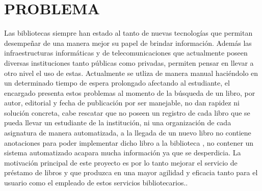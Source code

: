 \section{PROBLEMA} 

\begin{enumerate}[1.]
    
    Las bibliotecas siempre han estado al tanto de nuevas tecnologías que permitan desempeñar de una manera mejor su papel de brindar información. Además las infraestructuras informáticas y de telecomunicaciones que actualmente poseen diversas instituciones tanto públicas como privadas, permiten pensar en llevar a otro nivel el uso de estas.
    Actualmente se utliza de manera manual haciéndolo en un determinado tiempo de espera prolongado afectando al estudiante, el encargado presenta estos problemas al momento de la búsqueda de un libro, por autor, editorial y fecha de publicación por ser manejable, no dan rapidez ni solución concreta, cabe rescatar que no poseen un registro de cada libro que se pueda llevar un estudiante de la institución, ni una organización de cada asignatura de manera automatizada, a la llegada de un nuevo libro no contiene anotaciones para poder implementar dicho libro a la biblioteca , no contener un sistema automatizado acapara mucha información ya que se desperdicia.
La motivación principal de este proyecto es por lo tanto mejorar el servicio de préstamo de libros y que produzca en una mayor agilidad y eficacia tanto para el usuario como el empleado de estos servicios bibliotecarios..


\end{enumerate} 
